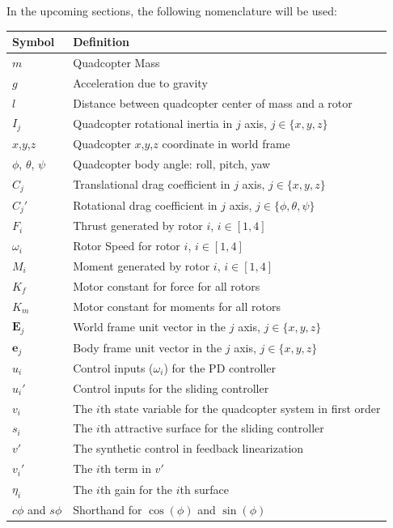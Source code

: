 \documentclass[conference]{IEEEtran}
\newcommand{\E}{\mathbf{E}}
\newcommand{\e}{\mathbf{e}}
\begin{document}
In the upcoming sections, the following nomenclature will be used:
\begin{table}[h]
\centering
\begin{tabular}{|l|l|}
\hline
\textbf{Symbol} & \textbf{Definition}                    \\ \hline
$m$             & Quadcopter Mass                        \\ \hline
$g$             & Acceleration due to gravity            \\ \hline
$l$             & Distance between quadcopter center of mass and a rotor \\ \hline
$I_j$           & Quadcopter rotational inertia in $j$ axis, $j \in \{ x,y,z\}$ \\ \hline
$x$,$y$,$z$     & Quadcopter $x$,$y$,$z$ coordinate in world frame \\ \hline
$\phi$, $\theta$, $\psi$ & Quadcopter body angle: roll, pitch, yaw  \\ \hline
$C_j$           & Translational drag coefficient in $j$ axis, $j \in \{ x,y,z\}$ \\ \hline
$C_j'$          & Rotational drag coefficient in $j$ axis, $j \in \{ \phi,\theta,\psi \}$  \\ \hline
$F_i$           & Thrust generated by rotor $i$, $i \in [ 1,4 ]$  \\ \hline
$\omega_i$      & Rotor Speed for rotor $i$, $i \in [ 1,4 ]$  \\ \hline
$M_i$           & Moment generated by rotor $i$, $i \in [ 1,4 ]$   \\ \hline
$K_f$           & Motor constant for force for all rotors  \\ \hline
$K_m$           & Motor constant for moments for all rotors  \\ \hline
$\E_j$          & World frame unit vector in the $j$ axis, $j \in \{ x,y,z\}$ \\ \hline
$\e_j$          & Body frame unit vector in the $j$ axis, $j \in \{ x,y,z\}$ \\ \hline
$u_i$           & Control inputs ($\omega_i$) for the PD controller  \\ \hline
$u_i'$          & Control inputs for the sliding controller  \\ \hline
$v_i$           & The $i$th state variable for the quadcopter system in first order\\ \hline
$s_i$           & The $i$th attractive surface for the sliding controller  \\ \hline
$v'$            & The synthetic control in feedback linearization  \\ \hline
$v_i'$          & The $i$th term in $v'$  \\ \hline
$\eta_i$       & The $i$th gain for the $i$th surface  \\ \hline
$c\phi$ and $s\phi$ & Shorthand for $\cos{(\phi)}$ and $\sin{(\phi)}$ \\ \hline
\end{tabular}
\end{table}
\end{document}
